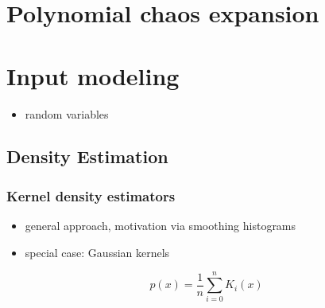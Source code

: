 \cite{zenger91sparse}
\cite{zenger91sparse, Adams12Rigorous}


\chapter{Polynomial chaos expansion}
\label{cha:polyn-chaos-expans}



\chapter{Input modeling}
\label{cha:input-modeling}

\begin{itemize}
\item random variables
\end{itemize}

\blindtext
\blindtext
\blindtext
\blindtext
\blindtext
\blindtext
\blindtext
\blindtext
\blindtext
\blindtext
\blindtext
\blindtext
\blindtext
\blindtext
\blindtext
\blindtext

\section{Density Estimation}
\label{sec:}

\blindtext
\blindtext
\blindtext
\blindtext
\blindtext
\blindtext
\blindtext
\blindtext
\blindtext
\blindtext
\blindtext
\blindtext
\blindtext
\blindtext
\blindtext
\blindtext

\subsection{Kernel density estimators}
\label{sec:kern-dens-estim}

\blindtext
\blindtext
\blindtext
\blindtext
\blindtext
\blindtext
\blindtext
\blindtext
\blindtext
\blindtext
\blindtext
\blindtext
\blindtext
\blindtext
\blindtext
\blindtext


\begin{itemize}
\item general approach, motivation via smoothing histograms
\item special case: Gaussian kernels
\end{itemize}

\begin{equation}
  p(x) = \frac{1}{n} \sum_{i = 0}^n K_i(x)
\end{equation}

